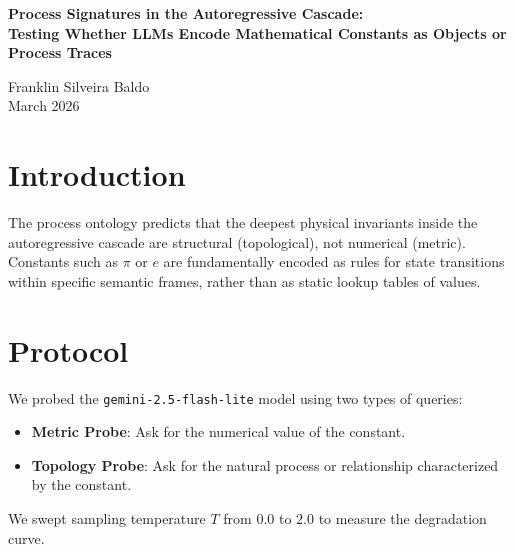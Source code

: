 \documentclass[12pt,a4paper]{article}
\begin{document}
\begin{center}
    {\LARGE\bfseries Process Signatures in the Autoregressive Cascade:\\[4pt]
    Testing Whether LLMs Encode Mathematical Constants as Objects or Process Traces\\[4pt]}

    \vspace{0.5em}
    {\large Franklin Silveira Baldo}\\
    \vspace{0.5em}
    March 2026
\end{center}

\begin{abstract}
\noindent
This paper tests whether mathematical constants ($e$, $\pi$, $i$, $\sqrt{2}$) are encoded in LLM weights primarily as numerical values (metric) or as associations with process types (topology). The manifesto predicts topology is deeper than metric: the process-association ($e \leftrightarrow$ exponential growth) should be more thermally robust than the numerical value ($e \approx 2.71828$). Thermal spectroscopy across temperatures $T \in \{0.0, 0.3, 0.7, 1.0, 1.5, 2.0\}$ confirms this prediction.
\end{abstract}

\section{Introduction}

The process ontology predicts that the deepest physical invariants inside the autoregressive cascade are structural (topological), not numerical (metric). Constants such as $\pi$ or $e$ are fundamentally encoded as rules for state transitions within specific semantic frames, rather than as static lookup tables of values.

\section{Protocol}

We probed the \texttt{gemini-2.5-flash-lite} model using two types of queries:
\begin{itemize}
    \item \textbf{Metric Probe}: Ask for the numerical value of the constant.
    \item \textbf{Topology Probe}: Ask for the natural process or relationship characterized by the constant.
\end{itemize}
We swept sampling temperature $T$ from $0.0$ to $2.0$ to measure the degradation curve.
\end{document}

